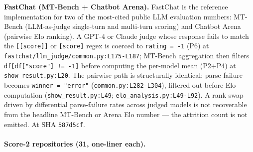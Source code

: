 \documentclass{article}
\begin{document}
\textbf{FastChat (MT-Bench + Chatbot Arena).} FastChat is the
reference implementation for two of the most-cited public LLM
evaluation numbers: MT-Bench (LLM-as-judge single-turn and
multi-turn scoring) and Chatbot Arena (pairwise Elo ranking). A
GPT-4 or Claude judge whose response fails to match the
\texttt{[[score]]} or \texttt{[score]} regex is coerced to
\texttt{rating = -1} (P6) at
\texttt{fastchat/llm\_judge/common.py:L175-L187}; MT-Bench
aggregation then filters \texttt{df[df["score"] != -1]} before
computing the per-model mean (P2+P4) at
\texttt{show\_result.py:L20}. The pairwise path is structurally
identical: parse-failure becomes \texttt{winner = "error"}
(\texttt{common.py:L282-L304}), filtered out before Elo
computation (\texttt{show\_result.py:L49};
\texttt{elo\_analysis.py:L49-L92}). A rank swap driven by
differential parse-failure rates across judged models is not
recoverable from the headline MT-Bench or Arena Elo number ---
the attrition count is not emitted. At SHA \texttt{587d5cf}.

\paragraph{Score-2 repositories (31, one-liner each).}
\end{document}
